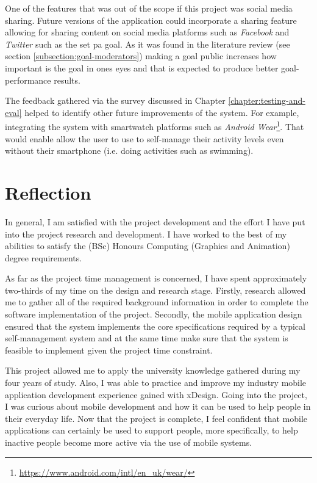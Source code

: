 One of the features that was out of the scope if this project was social media sharing. Future versions of the application could incorporate a sharing feature allowing for sharing content on social media platforms such as \textit{Facebook} and \textit{Twitter} such as the set \gls{pa} goal. As it was found in the literature review (see section \ref{subsection:goal-moderators}) making a goal public increases how important is the goal in ones eyes and that is expected to produce better goal-performance results. 

The feedback gathered via the survey discussed in Chapter \ref{chapter:testing-and-eval} helped to identify other future improvements of the system. For example, integrating the system with smartwatch platforms such as \textit{Android Wear}\footnote{\url{https://www.android.com/intl/en_uk/wear/}}. That would enable allow the user to use to self-manage their activity levels even without their smartphone (i.e. doing activities such as swimming). 

\section{Reflection}
In general, I am satisfied with the project development and the effort I have put into the project research and development. I have worked to the best of my abilities to satisfy the (BSc) Honours Computing (Graphics and Animation) degree requirements.

As far as the project time management is concerned, I have spent approximately two-thirds of my time on the design and research stage. Firstly, research allowed me to gather all of the required background information in order to complete the software implementation of the project. Secondly, the mobile application design ensured that the system implements the core specifications required by a typical self-management system and at the same time make sure that the system is feasible to implement given the project time constraint.

This project allowed me to apply the university knowledge gathered during my four years of study. Also, I was able to practice and improve my industry mobile application development experience gained with xDesign. Going into the project, I was curious about mobile development and how it can be used to help people in their everyday life. Now that the project is complete, I feel confident that mobile applications can certainly be used to support people, more specifically, to help inactive people become more active via the use of mobile systems.
